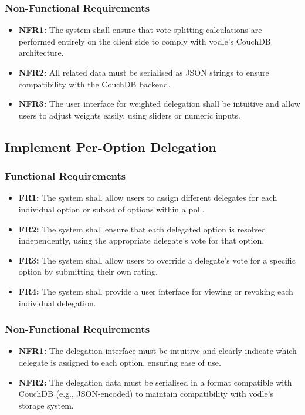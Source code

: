 \subsubsection{Non-Functional Requirements}
\begin{itemize}
    \item \textbf{NFR1:} The system shall ensure that vote-splitting calculations are performed entirely on the client side to comply with vodle's CouchDB architecture.

    \item \textbf{NFR2:} All related data must be serialised as JSON strings to ensure compatibility with the CouchDB backend.

    \item \textbf{NFR3:} The user interface for weighted delegation shall be intuitive and allow users to adjust weights easily, using sliders or numeric inputs.
\end{itemize}
\subsection{Implement Per-Option Delegation}
\subsubsection{Functional Requirements}
\begin{itemize}
    \item \textbf{FR1:} The system shall allow users to assign different delegates for each individual option or subset of options within a poll.

    \item \textbf{FR2:} The system shall ensure that each delegated option is resolved independently, using the appropriate delegate's vote for that option.

    \item \textbf{FR3:} The system shall allow users to override a delegate's vote for a specific option by submitting their own rating.

    \item \textbf{FR4:} The system shall provide a user interface for viewing or revoking each individual delegation.
\end{itemize}

\subsubsection{Non-Functional Requirements}
\begin{itemize}
    \item \textbf{NFR1:} The delegation interface must be intuitive and clearly indicate which delegate is assigned to each option, ensuring ease of use.

    \item \textbf{NFR2:} The delegation data must be serialised in a format compatible with CouchDB (e.g., JSON-encoded) to maintain compatibility with vodle's storage system.
\end{itemize}
